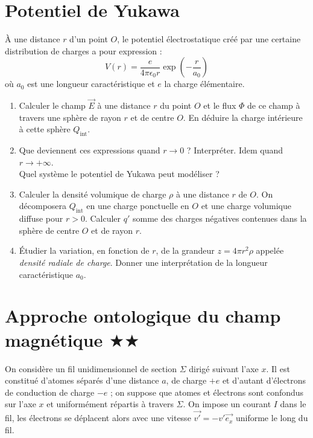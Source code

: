 \documentclass{report}
\begin{document}
\newpage

\section*{Potentiel de Yukawa}

\`{A} une distance $r$ d'un point $O$, le potentiel électrostatique créé par une certaine distribution de charges a pour expression :
$$
V(r)=\frac{e}{4\pi \epsilon_0r}\exp\left( -\frac{r}{a_0}\right) 
$$
où $a_0$ est une longueur caractéristique et $e$ la charge élémentaire.

\begin{enumerate}
\item Calculer le champ $\vec{E}$ à une distance $r$ du point $O$ et le flux $\Phi$ de ce champ à travers une sphère de rayon $r$ et de centre $O$. En déduire la charge intérieure à cette sphère $Q_{\mathrm{int}}$. 
\item Que deviennent ces expressions quand $r\rightarrow 0$ ? Interpréter. Idem quand $r\rightarrow +\infty$.\\ Quel système le potentiel de Yukawa peut modéliser ?
\item Calculer la densité volumique de charge $\rho$ à une distance $r$ de $O$. On décomposera $Q_{\mathrm{int}}$ en une charge ponctuelle en $O$ et une charge volumique diffuse pour $r>0$. Calculer $q'$ somme des charges négatives contenues dans la sphère de centre $O$ et de rayon $r$.
\item \'{E}tudier la variation, en fonction de $r$, de la grandeur $z=4\pi r^2\rho$ appelée \textit{densité radiale de charge}. Donner une interprétation de la longueur caractéristique $a_0$.
\end{enumerate}

\newpage

\section*{Approche ontologique du champ magnétique $\bigstar\bigstar$}

On considère un fil unidimensionnel de section $\Sigma$ dirigé suivant l'axe $x$. Il est constitué d'atomes séparés d'une distance $a$, de charge $+e$  et d'autant d'électrons de conduction de charge $-e$ ; on suppose que atomes et électrons sont confondus sur l'axe $x$ et uniformément répartis à travers $\Sigma$. On impose un courant $I$ dans le fil, les électrons se déplacent alors avec une vitesse $\vec{v'}=-v'\vec{e_{x}}$ uniforme le long du fil.
\end{document}
